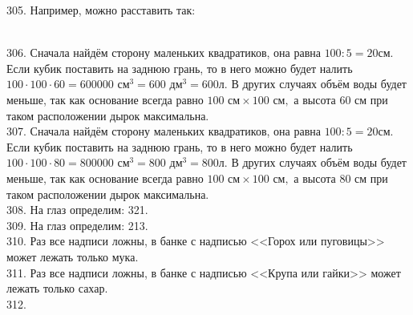 \documentclass[12pt]{article}
\begin{document}
305. Например, можно расставить так:
\begin{figure}[ht!]
\end{figure}\\
306. Сначала найдём сторону маленьких квадратиков, она равна $100:5=20$см. Если кубик поставить на заднюю грань, то в него можно будет налить $100\cdot100\cdot60=600000\text{ см}^3=600\text{ дм}^3=600$л. В других случаях объём воды будет меньше, так как основание всегда равно $100\text{ см}\times100\text{ см},$ а высота 60 см при таком расположении дырок максимальна.\\
307. Сначала найдём сторону маленьких квадратиков, она равна $100:5=20$см. Если кубик поставить на заднюю грань, то в него можно будет налить $100\cdot100\cdot80=800000\text{ см}^3=800\text{ дм}^3=800$л. В других случаях объём воды будет меньше, так как основание всегда равно $100\text{ см}\times100\text{ см},$ а высота 80 см при таком расположении дырок максимальна.\\
308. На глаз определим: 321.\\
309. На глаз определим: 213.\\
310. Раз все надписи ложны, в банке с надписью <<Горох или пуговицы>> может лежать только мука.\\
311. Раз все надписи ложны, в банке с надписью <<Крупа или гайки>> может лежать только сахар.\\
312.\begin{figure}[ht!]
\end{figure}\\
\end{document}
